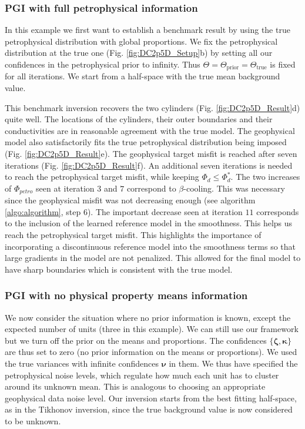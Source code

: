 \documentclass[extra]{gji} %
\begin{document}
\subsubsection{PGI with full petrophysical information}

In this example we first want to establish a benchmark result by using the true petrophysical distribution with global proportions. We fix the petrophysical distribution at the true one (Fig. \ref{fig:DC2p5D_Setup}b) by setting all our confidences in the petrophysical prior to infinity. Thus $\Theta=\Theta_{\text{prior}}=\Theta_{\text{true}}$ is fixed for all iterations. We start from a half-space with the true mean background value.

This benchmark inversion recovers the two cylinders (Fig. \ref{fig:DC2p5D_Result}d) quite well. The locations of the cylinders, their outer boundaries and their conductivities are in reasonable agreement with the true model. The geophysical model also satisfactorily fits the true petrophysical distribution being imposed (Fig. \ref{fig:DC2p5D_Result}e). The geophysical target misfit is reached after seven iterations (Fig. \ref{fig:DC2p5D_Result}f). An additional seven iterations is needed to reach the petrophysical target misfit, while keeping $\Phi_d\leq\Phi_d^*$. The two increases of $\Phi_{petro}$ seen at iteration $3$ and $7$ correspond to $\beta$-cooling.  This was necessary since the geophysical misfit was not decreasing enough (see algorithm \ref{algo:algorithm}, step 6). The important decrease seen at iteration $11$ corresponds to the inclusion of the learned reference model in the smoothness. This helps us reach the petrophysical target misfit. This highlights the importance of incorporating a discontinuous reference model into the smoothness terms so that large gradients in the model are not penalized. This allowed for the final model to have sharp boundaries which is consistent with the true model.

\subsubsection{PGI with no physical property means information}

We now consider the situation where no prior information is known, except the expected number of units (three in this example). We can still use our framework but we turn off the prior on the means and proportions. The confidences $\{\mathbf{\zeta},\mathbf{\kappa}\}$ are thus set to zero (no prior information on the means or proportions). We used the true variances with infinite confidences $\mathbf{\nu}$ in them. We thus have specified the petrophysical noise levels, which regulate how much each unit has to cluster around its unknown mean. This is analogous to choosing an appropriate geophysical data noise level. Our inversion starts from the best fitting half-space, as in the Tikhonov inversion, since the true background value is now considered to be unknown.
\end{document}
